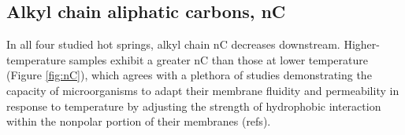 

\subsection{Alkyl chain aliphatic carbons, nC} In all four studied hot springs, alkyl chain nC decreases downstream. Higher-temperature samples exhibit a greater nC than those at lower temperature (Figure \ref{fig:nC}), which agrees with a plethora of studies demonstrating the capacity of microorganisms to adapt their membrane fluidity and permeability in response to temperature by adjusting the strength of hydrophobic interaction within the nonpolar portion of their membranes (refs).




